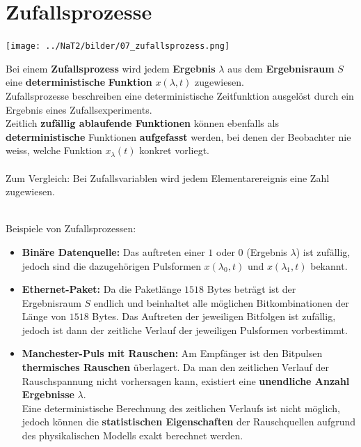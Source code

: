\section{Zufallsprozesse }
\begin{minipage}{10.3cm}
	\texttt{[image: ../NaT2/bilder/07\_zufallsprozess.png]}
\end{minipage}
\begin{minipage}{8.5cm}
	Bei einem \textbf{Zufallsprozess} wird jedem \textbf{Ergebnis} \boldmath$\lambda$ aus 
	dem \textbf{Ergebnisraum} $S$ eine \textbf{deterministische} \textbf{Funktion} $x(\lambda, t)$
	\unboldmath zugewiesen. \\
	Zufallsprozesse beschreiben eine deterministische Zeitfunktion ausgelöst durch ein Ergebnis eines
	Zufallsexperiments. \\
	Zeitlich \textbf{zufällig ablaufende Funktionen} können ebenfalls als \textbf{deterministische} Funktionen 
	\textbf{aufgefasst} werden, bei denen der Beobachter nie weiss, welche Funktion $x_\lambda(t)$ konkret
	vorliegt.	\\ \\
	Zum Vergleich: Bei Zufallsvariablen wird jedem Elementarereignis eine Zahl zugewiesen. 
\end{minipage} 
\vspace{0.5cm} \\
Beispiele von Zufallsprozessen:
\begin{itemize}
  \item \textbf{Binäre Datenquelle:} Das auftreten einer $1$ oder $0$ (Ergebnis $\lambda$) ist
  zufällig, jedoch sind die dazugehörigen Pulsformen $x(\lambda_0, t)$ und $x(\lambda_1, t)$
  bekannt.
  \item \textbf{Ethernet-Paket:} Da die Paketlänge $1518$ Bytes beträgt ist der Ergebnisraum $S$
  endlich und beinhaltet alle möglichen Bitkombinationen der Länge von $1518$ Bytes. Das Auftreten
  der jeweiligen Bitfolgen ist zufällig, jedoch ist dann der zeitliche Verlauf der jeweiligen
  Pulsformen vorbestimmt.
  \item \textbf{Manchester-Puls mit Rauschen:} Am Empfänger ist den Bitpulsen \textbf{thermisches Rauschen}
  überlagert. Da man den zeitlichen Verlauf der Rauschspannung nicht vorhersagen kann, existiert
  eine \textbf{unendliche Anzahl Ergebnisse} $\lambda$. \\
  Eine deterministische Berechnung des zeitlichen Verlaufs ist nicht möglich, jedoch können die
  \textbf{statistischen Eigenschaften} der Rauschquellen aufgrund des physikalischen Modells exakt berechnet
  werden.
\end{itemize}

